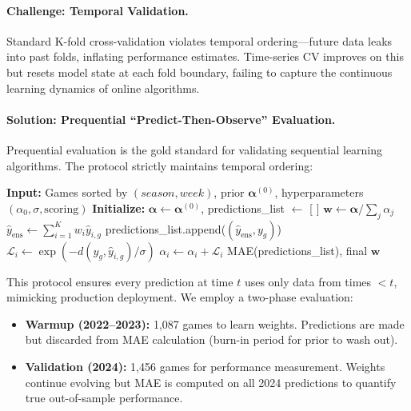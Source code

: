 \paragraph{Challenge: Temporal Validation.}
Standard K-fold cross-validation violates temporal ordering---future data leaks into past folds, inflating performance estimates. Time-series CV improves on this but resets model state at each fold boundary, failing to capture the continuous learning dynamics of online algorithms.

\paragraph{Solution: Prequential ``Predict-Then-Observe'' Evaluation.}
Prequential evaluation \citep{dawid1984} is the gold standard for validating sequential learning algorithms. The protocol strictly maintains temporal ordering:

\begin{algorithm}[H]
\caption{Prequential Evaluation for Dirichlet Stacking}
\label{alg:prequential}
\begin{algorithmic}[1]
\State \textbf{Input:} Games sorted by $(season, week)$, prior $\boldsymbol{\alpha}^{(0)}$, hyperparameters $(\alpha_0, \sigma, \text{scoring})$
\State \textbf{Initialize:} $\boldsymbol{\alpha} \gets \boldsymbol{\alpha}^{(0)}$, predictions\_list $\gets$ [ ]
    \State $\mathbf{w} \gets \boldsymbol{\alpha} / \sum_j \alpha_j$ 
    \State $\hat{y}_{\text{ens}} \gets \sum_{i=1}^K w_i \hat{y}_{i,g}$ 
    \State predictions\_list.append($(\hat{y}_{\text{ens}}, y_g)$)
     
        \State $\mathcal{L}_i \gets \exp(-d(y_g, \hat{y}_{i,g}) / \sigma)$
        \State $\alpha_i \gets \alpha_i + \mathcal{L}_i$
    \EndFor
\EndFor
\State \Return MAE(predictions\_list), final $\mathbf{w}$
\end{algorithmic}
\end{algorithm}

This protocol ensures every prediction at time $t$ uses only data from times $< t$, mimicking production deployment. We employ a two-phase evaluation:
\begin{itemize}
\item \textbf{Warmup (2022--2023):} 1,087 games to learn weights. Predictions are made but discarded from MAE calculation (burn-in period for prior to wash out).
\item \textbf{Validation (2024):} 1,456 games for performance measurement. Weights continue evolving but MAE is computed on all 2024 predictions to quantify true out-of-sample performance.
\end{itemize}

